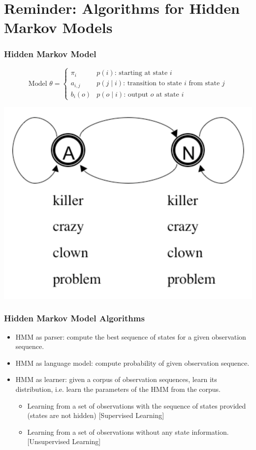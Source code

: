 
\section{Reminder: Algorithms for Hidden Markov Models}

\begin{frame}
\frametitle{Hidden Markov Model}
\[
\textrm{Model $\theta$} = \left\{ 
\begin{array}{ll} 
\pi_i & \textrm{$p(i)$: starting at state $i$} \\ 
a_{i,j} & \textrm{$p(j \mid i)$: transition to state $i$ from state $j$} \\ 
b_i(o) & \textrm{$p( o \mid i)$: output $o$ at state $i$}
\end{array} 
\right.\]

\begin{center}
\includegraphics[scale=.4]{figures/hmmfig}
\end{center}
\end{frame}

\begin{frame}
\frametitle{Hidden Markov Model Algorithms}
\begin{itemize}
\item HMM as parser: compute the best sequence of states for a given observation sequence.
\item HMM as language model: compute probability of given observation sequence.
\item HMM as learner: given a corpus of observation sequences, learn its distribution, i.e. learn the parameters of the HMM from the corpus.
\begin{itemize}
\item Learning from a set of observations with the sequence of states provided (states are not hidden) {\color{blue} [Supervised Learning]}
\item Learning from a set of observations without any state information. {\color{blue} [Unsupervised Learning]}
\end{itemize}
\end{itemize}
\end{frame}


